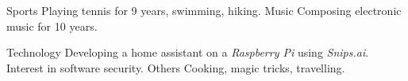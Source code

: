 
	\begin{cvskills}
		\cvskill
			{Sports}
			{Playing tennis for 9 years, swimming, hiking.}
		\cvskill
			{Music}
			{Composing electronic music for 10 years.}
	
		\cvskill
			{Technology}
			{Developing a home assistant on a \textit{Raspberry Pi} using \textit{Snips.ai}. Interest in software security.}
		\cvskill
			{Others}
			{Cooking, magic tricks, travelling.}
			
	\end{cvskills}
